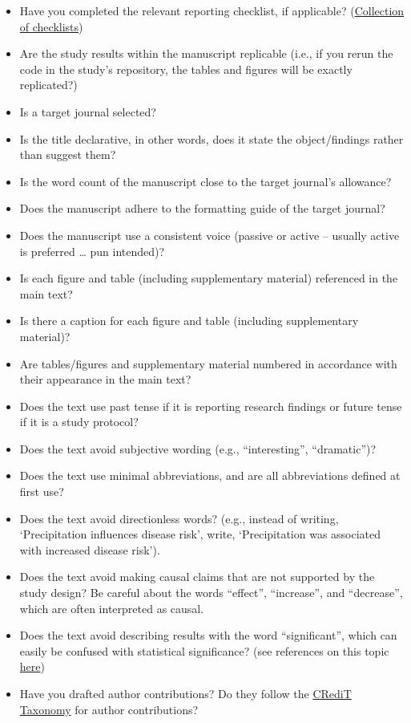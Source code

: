 \documentclass[
]{book}
\providecommand{\tightlist}{%
  \setlength{\itemsep}{0pt}\setlength{\parskip}{0pt}}
\begin{document}
\begin{itemize}
\tightlist
\item
  Have you completed the relevant reporting checklist, if applicable? (\href{https://www.equator-network.org/about-us/what-is-a-reporting-guideline/}{Collection of checklists})
\item
  Are the study results within the manuscript replicable (i.e., if you rerun the code in the study's repository, the tables and figures will be exactly replicated?)
\item
  Is a target journal selected?
\item
  Is the title declarative, in other words, does it state the object/findings rather than suggest them?
\item
  Is the word count of the manuscript close to the target journal's allowance?
\item
  Does the manuscript adhere to the formatting guide of the target journal?
\item
  Does the manuscript use a consistent voice (passive or active -- usually active is preferred \ldots{} pun intended)?
\item
  Is each figure and table (including supplementary material) referenced in the main text?
\item
  Is there a caption for each figure and table (including supplementary material)?
\item
  Are tables/figures and supplementary material numbered in accordance with their appearance in the main text?
\item
  Does the text use past tense if it is reporting research findings or future tense if it is a study protocol?
\item
  Does the text avoid subjective wording (e.g., ``interesting'', ``dramatic'')?
\item
  Does the text use minimal abbreviations, and are all abbreviations defined at first use?
\item
  Does the text avoid directionless words? (e.g., instead of writing, `Precipitation influences disease risk', write, `Precipitation was associated with increased disease risk').
\item
  Does the text avoid making causal claims that are not supported by the study design? Be careful about the words ``effect'', ``increase'', and ``decrease'', which are often interpreted as causal.
\item
  Does the text avoid describing results with the word ``significant'', which can easily be confused with statistical significance? (see references on this topic \href{https://journals.lww.com/epidem/Fulltext/2001/05000/The_Value_of_P.2.aspx}{here})
\item
  Have you drafted author contributions? Do they follow the \href{https://journals.plos.org/plosone/s/authorship/?utm_source=plos\&utm_medium=blog\&utm_campaign=plos-1607-credit\#loc-author-contributions}{CRediT Taxonomy} for author contributions?
\end{itemize}
\end{document}
